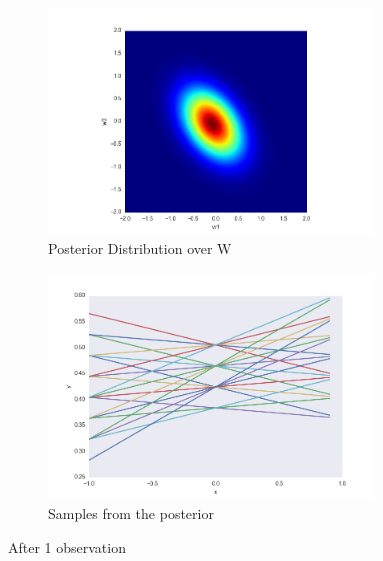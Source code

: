 \documentclass[a4paper,11pt]{article}
\theoremstyle{mytheor}
\begin{document}
\begin{figure}[h]
\begin{subfigure}{0.5\textwidth}
\includegraphics[width=\linewidth, height=6cm]{posterior-1point} 
\caption{Posterior Distribution over W}
\end{subfigure}
\begin{subfigure}{0.5\textwidth}
\includegraphics[width=\linewidth, height=6cm]{samples-1point}
\caption{Samples from the posterior}
\end{subfigure}
\caption{After 1 observation}
\label{fig:one}
\end{figure}
\end{document}
